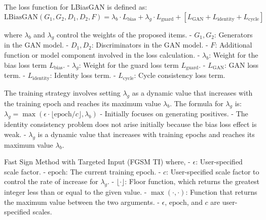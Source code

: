 The loss function for LBiasGAN is defined as:
$
\text{LBiasGAN}(G_1, G_2, D_1, D_2, F) = \lambda_b \cdot L_{\text{bias}} + \lambda_g \cdot L_{\text{guard}} + [L_{\text{GAN}} + L_{\text{identity}} + L_{\text{cycle}}]
$

where $\lambda_b$ and $\lambda_g$ control the weights of the proposed items.
- $G_1, G_2$: Generators in the GAN model.
- $D_1, D_2$: Discriminators in the GAN model.
- $F$: Additional function or model component involved in the loss calculation.
- $\lambda_b$: Weight for the bias loss term $L_{\text{bias}}$.
- $\lambda_g$: Weight for the guard loss term $L_{\text{guard}}$.
- $L_{\text{GAN}}$: GAN loss term.
- $L_{\text{identity}}$: Identity loss term.
- $L_{\text{cycle}}$: Cycle consistency loss term.

The training strategy involves setting $\lambda_g$ as a dynamic value that increases with the training epoch and reaches its maximum value $\lambda_b$. The formula for $\lambda_g$ is:
$
\lambda_g = \max(\epsilon \cdot \lfloor \text{epoch} / c \rfloor, \lambda_b)
$
- Initially focuses on generating positives.
- The identity consistency problem does not arise initially because the bias loss effect is weak.
- $\lambda_g$ is a dynamic value that increases with training epochs and reaches its maximum value $\lambda_b$.

Fast Sign Method with Targeted Input (FGSM TI) where,
- $\epsilon$: User-specified scale factor.
- $\text{epoch}$: The current training epoch.
- $c$: User-specified scale factor to control the rate of increase for $\lambda_g$.
- $\lfloor \cdot \rfloor$: Floor function, which returns the greatest integer less than or equal to the given value.
- $\max(\cdot, \cdot)$: Function that returns the maximum value between the two arguments.
- $\epsilon$, $\text{epoch}$, and $c$ are user-specified scales.

